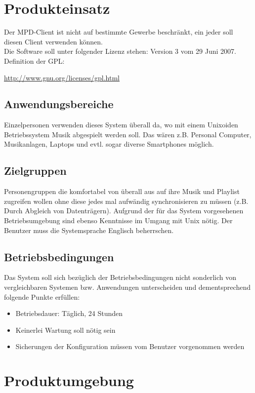 \section{Produkteinsatz}
Der MPD-Client ist nicht auf bestimmte Gewerbe beschränkt, ein jeder soll diesen Client
verwenden können. \\
Die Software soll unter folgender Lizenz stehen:
Version 3 vom 29 Juni 2007.\ \\ 
Definition der GPL:
\begin{center}
    \url{http://www.gnu.org/licenses/gpl.html}
\end{center}
\subsection{Anwendungsbereiche}
Einzelpersonen verwenden dieses System überall da, wo mit
einem Unixoiden Betriebssystem Musik abgespielt werden soll.
Das wären z.B. Personal Computer, Musikanlagen, Laptops und evtl.
sogar diverse Smartphones möglich.

\subsection{Zielgruppen}
Personengruppen die komfortabel von überall aus auf ihre Musik und Playlist zugreifen
wollen ohne diese jedes mal aufwändig synchronisieren zu müssen (z.B. Durch Abgleich von Datenträgern). 
Aufgrund der für das System vorgesehenen Betriebsumgebung sind ebenso Kenntnisse im Umgang mit Unix nötig. 
Der Benutzer muss die Systemsprache Englisch beherrschen.


\subsection{Betriebsbedingungen}
Das System soll sich bezüglich der Betriebsbedingungen nicht sonderlich von vergleichbaren Systemen bzw.
Anwendungen unterscheiden und dementsprechend folgende Punkte erfüllen:
\begin{itemize}
        \item Betriebsdauer: Täglich, 24 Stunden
        \item Keinerlei Wartung soll nötig sein
        \item Sicherungen der Konfiguration müssen vom Benutzer vorgenommen werden
\end{itemize}

\section{Produktumgebung}
